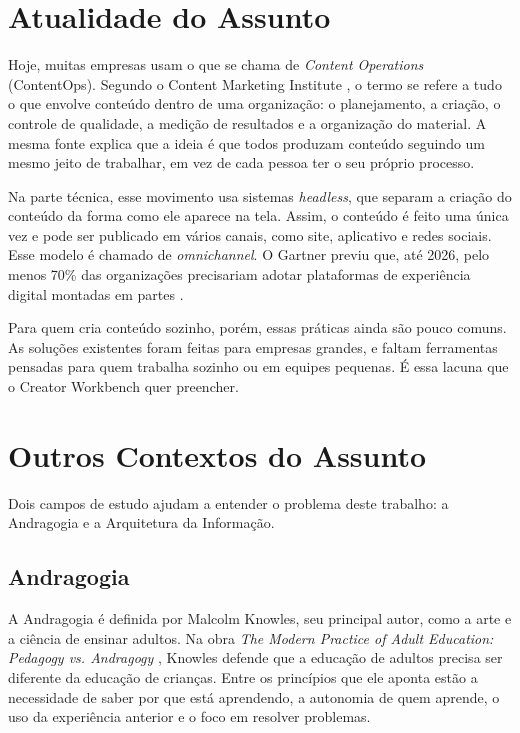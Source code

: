 \section{Atualidade do Assunto}

Hoje, muitas empresas usam o que se chama de \textit{Content Operations} (ContentOps). Segundo o Content Marketing Institute \cite{mcknight2023}, o termo se refere a tudo o que envolve conteúdo dentro de uma organização: o planejamento, a criação, o controle de qualidade, a medição de resultados e a organização do material. A mesma fonte explica que a ideia é que todos produzam conteúdo seguindo um mesmo jeito de trabalhar, em vez de cada pessoa ter o seu próprio processo.

Na parte técnica, esse movimento usa sistemas \textit{headless}, que separam a criação do conteúdo da forma como ele aparece na tela. Assim, o conteúdo é feito uma única vez e pode ser publicado em vários canais, como site, aplicativo e redes sociais. Esse modelo é chamado de \textit{omnichannel}. O Gartner previu que, até 2026, pelo menos 70\% das organizações precisariam adotar plataformas de experiência digital montadas em partes \cite{demeny2025}.

Para quem cria conteúdo sozinho, porém, essas práticas ainda são pouco comuns. As soluções existentes foram feitas para empresas grandes, e faltam ferramentas pensadas para quem trabalha sozinho ou em equipes pequenas. É essa lacuna que o Creator Workbench quer preencher.

\section{Outros Contextos do Assunto}

Dois campos de estudo ajudam a entender o problema deste trabalho: a Andragogia e a Arquitetura da Informação.

\subsection{Andragogia}

A Andragogia é definida por Malcolm Knowles, seu principal autor, como a arte e a ciência de ensinar adultos. Na obra \textit{The Modern Practice of Adult Education: Pedagogy vs. Andragogy} \cite{knowles1970}, Knowles defende que a educação de adultos precisa ser diferente da educação de crianças. Entre os princípios que ele aponta estão a necessidade de saber por que está aprendendo, a autonomia de quem aprende, o uso da experiência anterior e o foco em resolver problemas.

